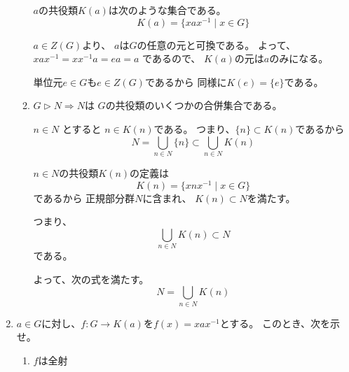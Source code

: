 \documentclass[12pt,b5paper]{ltjsarticle}
\begin{document}
\begin{enumerate}
\begin{enumerate}
             $a$の共役類$K(a)$は次のような集合である。
             \begin{equation}
              K(a) = \{xax^{-1} \mid x\in G \}
             \end{equation}

             $a\in Z(G)$より、
             $a$は$G$の任意の元と可換である。
             よって、$xax^{-1} = xx^{-1}a=ea=a$
             であるので、
             $K(a)$の元は$a$のみになる。

             単位元$e\in G$も$e\in Z(G)$であるから
             同様に$K(e)=\{e\}$である。

             \hrulefill

       \item $G \triangleright N \Rightarrow N$は
             $G$の共役類のいくつかの合併集合である。

             \dotfill

             $n \in N$ とすると $n \in K(n)$である。
             つまり、$\{n\} \subset K(n)$であるから
             \begin{equation}
              N= \bigcup_{n\in N} \{n\}
               \subset \bigcup_{n\in N} K(n)
             \end{equation}

             $n\in N$の共役類$K(n)$の定義は
             \begin{equation}
              K(n) = \{xnx^{-1} \mid x\in G \}
             \end{equation}
             であるから
             正規部分群$N$に含まれ、
             $K(n) \subset N$を満たす。

             つまり、
             \begin{equation}
              \bigcup_{n\in N} K(n) \subset N
             \end{equation}
             である。

             よって、次の式を満たす。
             \begin{equation}
              N= \bigcup_{n\in N} K(n)
             \end{equation}

             \hrulefill

      \end{enumerate}
 \item $a\in G$に対し、$f:G\to K(a)$を$f(x)=xax^{-1}$とする。
       このとき、次を示せ。
       \begin{enumerate}
        \item $f$は全射


\end{enumerate}
\end{enumerate}
\end{document}
